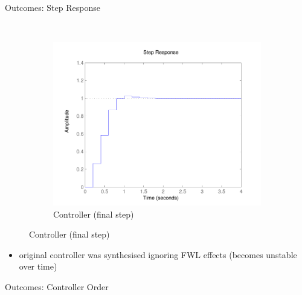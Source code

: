 \documentclass{beamer}
\begin{document}
\begin{frame}[fragile]{Outcomes: Step Response}
\begin{figure}
    ~
    \begin{subfigure}[b]{0.3\textwidth}
        \includegraphics[width=\textwidth]{figures/runningexample_step2.pdf}
        \caption{Controller (final step)}
        \label{fig:step2}
    \end{subfigure}
\end{figure}

\begin{itemize} 
\item 
original controller was synthesised ignoring FWL effects (becomes unstable over time) 
\end{itemize}

\end{frame}


\begin{frame}[fragile]{Outcomes: Controller Order}
\begin{figure}
\end{figure}
\end{frame}
\end{document}
